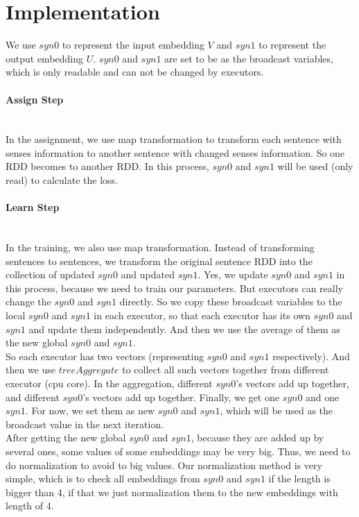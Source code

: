 \section{Implementation}

We use $syn0$ to represent the input embedding $V$ and $syn1$ to represent the output embedding $U$. $syn0$ and $syn1$ are set to be as the broadcast variables, which is only readable and can not be changed by executors.

\paragraph{Assign Step}\ \\
In the assignment, we use map transformation to transform each sentence with senses information to another sentence with changed senses information. So one RDD becomes to another RDD. In this process, $syn0$ and $syn1$ will be used (only read) to calculate the loss. 

\paragraph{Learn Step}\ \\
In the training, we also use map transformation. Instead of transforming sentences to sentences, we transform the original sentence RDD into the collection of updated $syn0$ and updated $syn1$. Yes, we update $syn0$ and $syn1$ in this process, because we need to train our parameters. But executors can really change the $syn0$ and $syn1$ directly. So we copy these broadcast variables to the local $syn0$ and $syn1$ in each executor, so that each executor has its own $syn0$ and $syn1$ and update them independently. And then we use the average of them as the new global $syn0$ and $syn1$.\\

So each executor has two vectors (representing $syn0$ and $syn1$ respectively). And then we use $treeAggregate$ to collect all such vectors together from different executor (cpu core).  In the aggregation, different $syn0$'s vectors add up together, and different $syn0$'s vectors add up together. Finally, we get one $syn0$ and one $syn1$. For now, we set them as new $syn0$ and $syn1$, which will be used as the broadcast value in the next iteration. \\

After getting the new global $syn0$ and $syn1$, because they are added up by several ones, some values of some embeddings may be very big. Thus, we need to do normalization to avoid to big values. Our normalization method is very simple, which is to check all embeddings from $syn0$ and $syn1$ if the length is bigger than 4, if that we just normalization them to the new embeddings with length of 4.\\


